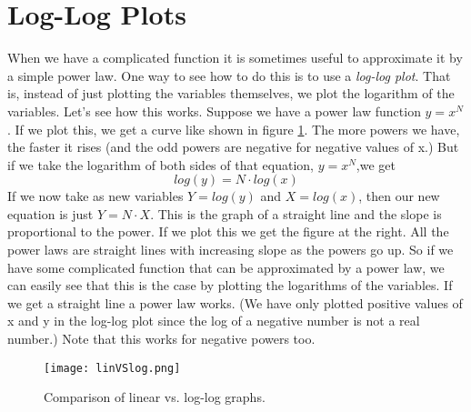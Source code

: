 \section{Log-Log Plots}
When we have a complicated function it is sometimes useful to approximate it by a simple power law.
One way to see how to do this is to use a \emph{log-log plot}.
That is, instead of just plotting the variables themselves, we plot the logarithm of the variables.
Let's see how this works.
Suppose we have a power law function $y = x^{N}$.
If we plot this, we get a curve like shown in figure \ref{fig:lin-log}.
The more powers we have, the faster it rises (and the odd powers are negative for negative values of x.)
But if we take the logarithm of both sides of that equation, $y = x^{N}$,we get
\[ log(y)=N \cdot log(x) \] 
If we now take as new variables $Y = log(y)$ and $X = log(x)$, then our new equation is just $Y = N \cdot X$.
This is the graph of a straight line and the slope is proportional to the power.
If we plot this we get the figure at the right.
All the power laws are straight lines with increasing slope as the powers go up.
So if we have some complicated function that can be approximated by a power law, we can easily see that this is the case by plotting the logarithms of the variables. 
If we get a straight line a power law works. 
(We have only plotted positive values of x and y in the log-log plot since the log of a negative number is not a real number.)
Note that this works for negative powers too. 

\begin{figure}[h]
	\centering
	\texttt{[image: linVSlog.png]}
	\caption{Comparison of linear vs. log-log graphs.}
	\label{fig:lin-log}
\end{figure}

